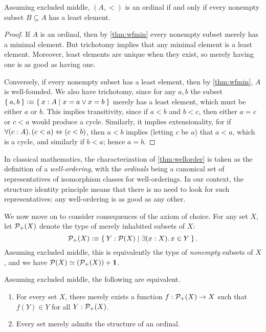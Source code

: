 \begin{thm}\label{thm:wellorder}
  Assuming excluded middle, $(A,<)$ is an ordinal if and only if every nonempty subset $B\subseteq A$ has a least element.
\end{thm}
\begin{proof}
  If $A$ is an ordinal, then by \cref{thm:wfmin} every nonempty subset merely has a minimal element.
  But trichotomy implies that any minimal element is a least element.
  Moreover, least elements are unique when they exist, so merely having one is as good as having one.

  Conversely, if every nonempty subset has a least element, then by \cref{thm:wfmin}, $A$ is well-founded.
  We also have trichotomy, since for any $a,b$ the subset
  $ \Set{a,b} \vcentcolon\equiv \Set{x:A | x=a \lor x=b} $
  merely has a least element, which must be either $a$ or $b$.
  This implies transitivity, since if $a<b$ and $b<c$, then either $a=c$ or $c<a$ would produce a cycle.
  Similarly, it implies extensionality, for if $\fall{c:A}(c<a)\Leftrightarrow (c<b)$, then $a<b$ implies (letting $c$ be $a$) that $a<a$, which is a cycle, and similarly if $b<a$; hence $a=b$.
\end{proof}

In classical mathematics, the characterization of \cref{thm:wellorder} is taken as the definition of a \emph{well-ordering}, with the \emph{ordinals} being a canonical set of representatives of isomorphism classes for well-orderings.
In our context, the structure identity principle means that there is no need to look for such representatives: any well-ordering is as good as any other.

We now move on to consider consequences of the axiom of choice.
For any set $X$, let $\mathcal{P}_+(X)$ denote the type of merely inhabited subsets of $X$:
\[ \powerp X \defeq \setof{ Y : \power X | \exis{x:X} x\in Y}. \]
Assuming excluded middle, this is equivalently the type of \emph{nonempty} subsets of $X$, and we have $\mathcal{P}(X) \simeq (\mathcal{P}_+(X)) + \mathbf{1}$.

\begin{thm}\label{thm:wop}
  Assuming excluded middle, the following are equivalent.
  \begin{enumerate}
  \item For every set $X$, there merely exists a function
    $ f: \mathcal{P}_+(X) \to X $
    such that $f(Y)\in Y$ for all $Y:\mathcal{P}_+(X)$.\label{item:wop1}
  \item Every set merely admits the structure of an ordinal.\label{item:wop2}
  \end{enumerate}
\end{thm}

